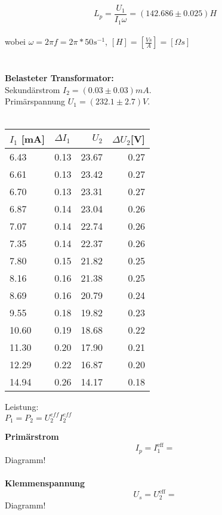 \documentclass{article}
\begin{document}
$$\boxed{L_p=\frac{U_1}{I_1 \omega}=(142.686 \pm 0.025)H}$$\\
wobei $\omega =2\pi f=2\pi*50s^{-1}$, $[H]=[\frac{Vs}{A}]=[\Omega s]$\\
\\
\\
\textbf{Belasteter Transformator:}\\
Sekundärstrom $I_2=(0.03 \pm 0.03)mA$.\\
Primärspannung $U_1=(232.1 \pm 2.7)V$.\\
\\
\begin{tabular}{|l|l|r|r|}
\hline
$I_1$ [mA] & $\Delta I_1$ & $U_2$ & $\Delta U_2$[V]\\
\hline
6.43 & 0.13 & 23.67 & 0.27\\
6.61 & 0.13 & 23.42 & 0.27 \\
6.70 & 0.13 & 23.31 & 0.27 \\
6.87 & 0.14 & 23.04 & 0.26 \\
7.07 & 0.14 & 22.74 & 0.26 \\
7.35 & 0.14 & 22.37 & 0.26 \\
7.80 & 0.15 & 21.82 & 0.25 \\
8.16 & 0.16 & 21.38 & 0.25 \\
8.69 & 0.16 & 20.79 & 0.24 \\
9.55 & 0.18 & 19.82 & 0.23 \\
10.60 & 0.19 & 18.68 & 0.22 \\
11.30 & 0.20 & 17.90 & 0.21 \\
12.29 & 0.22 & 16.87 & 0.20 \\
14.94 & 0.26 & 14.17 & 0.18 \\
\hline
\end{tabular}

Leistung:\\
$P_1=P_2=U_2^{eff}I_2^{eff}$


\textbf{Primärstrom}\\
$$I_p=I_1^{\textrm{eff}}=$$
Diagramm!\\
\\
\textbf{Klemmenspannung}\\
$$U_s=U_2^{\textrm{eff}}=$$
Diagramm!\\
\end{document}

